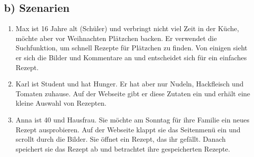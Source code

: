 \documentclass[parskip,10pt,abstracton]{scrartcl}
\begin{document}
% 
% 

\subsection*{b) Szenarien}

\begin{enumerate}[(1)]
 \item Max ist 16 Jahre alt (Schüler) und verbringt nicht viel Zeit in der Küche, möchte aber vor Weihnachten Plätzchen backen. Er verwendet die Suchfunktion, um schnell Rezepte für Plätzchen zu finden. Von einigen sieht er sich die Bilder und Kommentare an und entscheidet sich für ein einfaches Rezept.
 
 
 \item Karl ist Student und hat Hunger. Er hat aber nur Nudeln, Hackfleisch und Tomaten zuhause. Auf der Webseite gibt er diese Zutaten ein und erhält eine kleine Auswahl von Rezepten. 
 
 
 \item Anna ist 40 und Hausfrau. Sie möchte am Sonntag für ihre Familie ein neues Rezept ausprobieren. Auf der Webseite klappt sie das Seitenmenü ein und scrollt durch die Bilder. Sie öffnet ein Rezept, das ihr gefällt. Danach speichert sie das Rezept ab und betrachtet ihre gespeicherten Rezepte. 
 
\end{enumerate}
\end{document}

